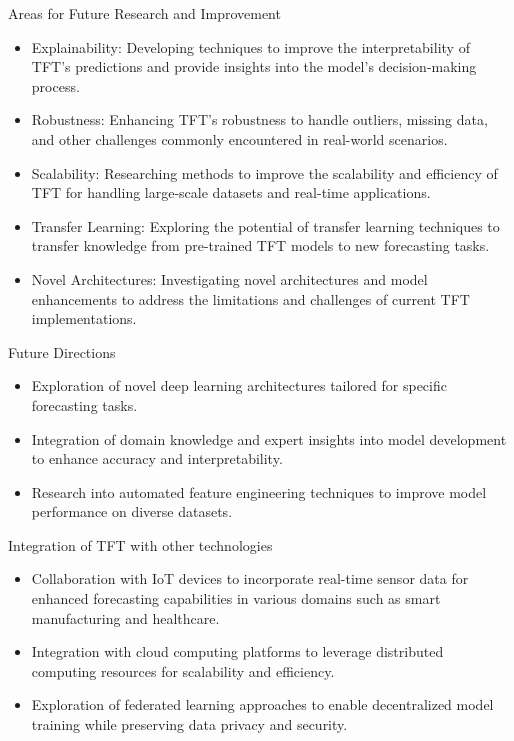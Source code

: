 \begin{frame}{Areas for Future Research and Improvement}
	
	
	
	
\begin{itemize}
	\item Explainability: Developing techniques to improve the interpretability of TFT's predictions and provide insights into the model's decision-making process.
	\item Robustness: Enhancing TFT's robustness to handle outliers, missing data, and other challenges commonly encountered in real-world scenarios.
	\item Scalability: Researching methods to improve the scalability and efficiency of TFT for handling large-scale datasets and real-time applications.
	\item Transfer Learning: Exploring the potential of transfer learning techniques to transfer knowledge from pre-trained TFT models to new forecasting tasks.
	\item Novel Architectures: Investigating novel architectures and model enhancements to address the limitations and challenges of current TFT implementations.
\end{itemize}
		\end{frame}
		
	\begin{frame}{Future Directions}
		
		
		
		
	\begin{itemize}
		\item Exploration of novel deep learning architectures tailored for specific forecasting tasks.
		\item Integration of domain knowledge and expert insights into model development to enhance accuracy and interpretability.
		\item Research into automated feature engineering techniques to improve model performance on diverse datasets.
	\end{itemize}
		
		
	\end{frame}
	
		\begin{frame}{Integration of TFT with other technologies}
\begin{itemize}
	\item Collaboration with IoT devices to incorporate real-time sensor data for enhanced forecasting capabilities in various domains such as smart manufacturing and healthcare.
	\item Integration with cloud computing platforms to leverage distributed computing resources for scalability and efficiency.
	\item Exploration of federated learning approaches to enable decentralized model training while preserving data privacy and security.
\end{itemize}
		\end{frame}
		
